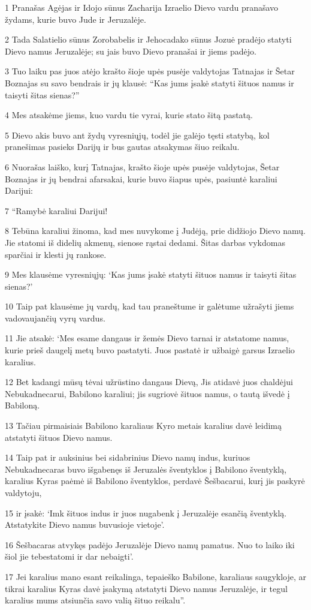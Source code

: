 \par 1 Pranašas Agėjas ir Idojo sūnus Zacharija Izraelio Dievo vardu pranašavo žydams, kurie buvo Jude ir Jeruzalėje. 
\par 2 Tada Salatielio sūnus Zorobabelis ir Jehocadako sūnus Jozuė pradėjo statyti Dievo namus Jeruzalėje; su jais buvo Dievo pranašai ir jiems padėjo. 
\par 3 Tuo laiku pas juos atėjo krašto šioje upės pusėje valdytojas Tatnajas ir Šetar Boznajas su savo bendrais ir jų klausė: “Kas jums įsakė statyti šituos namus ir taisyti šitas sienas?” 
\par 4 Mes atsakėme jiems, kuo vardu tie vyrai, kurie stato šitą pastatą. 
\par 5 Dievo akis buvo ant žydų vyresniųjų, todėl jie galėjo tęsti statybą, kol pranešimas pasieks Darijų ir bus gautas atsakymas šiuo reikalu. 
\par 6 Nuorašas laiško, kurį Tatnajas, krašto šioje upės pusėje valdytojas, Šetar Boznajas ir jų bendrai afarsakai, kurie buvo šiapus upės, pasiuntė karaliui Darijui: 
\par 7 “Ramybė karaliui Darijui! 
\par 8 Tebūna karaliui žinoma, kad mes nuvykome į Judėją, prie didžiojo Dievo namų. Jie statomi iš didelių akmenų, sienose rąstai dedami. Šitas darbas vykdomas sparčiai ir klesti jų rankose. 
\par 9 Mes klausėme vyresniųjų: ‘Kas jums įsakė statyti šituos namus ir taisyti šitas sienas?’ 
\par 10 Taip pat klausėme jų vardų, kad tau praneštume ir galėtume užrašyti jiems vadovaujančių vyrų vardus. 
\par 11 Jie atsakė: ‘Mes esame dangaus ir žemės Dievo tarnai ir atstatome namus, kurie prieš daugelį metų buvo pastatyti. Juos pastatė ir užbaigė garsus Izraelio karalius. 
\par 12 Bet kadangi mūsų tėvai užrūstino dangaus Dievą, Jis atidavė juos chaldėjui Nebukadnecarui, Babilono karaliui; jis sugriovė šituos namus, o tautą išvedė į Babiloną. 
\par 13 Tačiau pirmaisiais Babilono karaliaus Kyro metais karalius davė leidimą atstatyti šituos Dievo namus. 
\par 14 Taip pat ir auksinius bei sidabrinius Dievo namų indus, kuriuos Nebukadnecaras buvo išgabenęs iš Jeruzalės šventyklos į Babilono šventyklą, karalius Kyras paėmė iš Babilono šventyklos, perdavė Šešbacarui, kurį jis paskyrė valdytoju, 
\par 15 ir įsakė: ‘Imk šituos indus ir juos nugabenk į Jeruzalėje esančią šventyklą. Atstatykite Dievo namus buvusioje vietoje’. 
\par 16 Šešbacaras atvykęs padėjo Jeruzalėje Dievo namų pamatus. Nuo to laiko iki šiol jie tebestatomi ir dar nebaigti’. 
\par 17 Jei karalius mano esant reikalinga, tepaieško Babilone, karaliaus saugykloje, ar tikrai karalius Kyras davė įsakymą atstatyti Dievo namus Jeruzalėje, ir tegul karalius mums atsiunčia savo valią šituo reikalu”.



